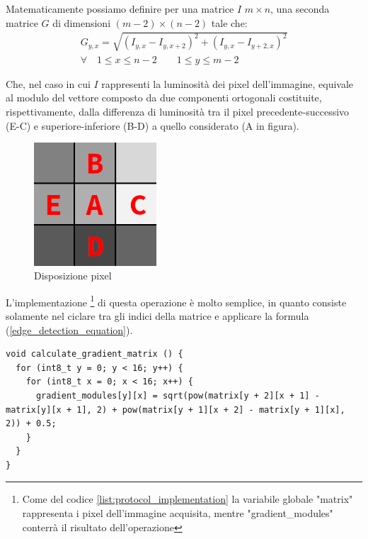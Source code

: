\documentclass[12pt]{article}
\newenvironment{changemargin}[2]{%
    \begin{list}{}{%
    \setlength{\topsep}{0pt}%
    \setlength{\leftmargin}{#1}%
    \setlength{\rightmargin}{#2}%
    \setlength{\listparindent}{\parindent}%
    \setlength{\itemindent}{\parindent}%
    \setlength{\parsep}{\parskip}%
    }%
    \item[]}{\end{list}}
\begin{document}
        Matematicamente possiamo definire per una matrice $I$ $m \times n$, una seconda matrice $G$ di dimensioni $(m-2) \times (n-2)$ tale che:
        \begin{equation}\label{edge_detection_equation}
        \begin{split}
            G_{y, x} = \sqrt{\left(I_{y, x} - I_{y, x+2}\right)^2 + \left( I_{y, x} - I_{y+2, x} \right)^2} \\
            \forall \quad 1 \leq x \leq n-2 \qquad
            1 \leq y \leq m-2
        \end{split}
        \end{equation} 
        
        Che, nel caso in cui $I$ rappresenti la luminosità dei pixel dell'immagine, equivale al modulo del vettore composto da due componenti ortogonali costituite, rispettivamente, dalla differenza di luminosità tra il pixel precedente-successivo (E-C) e superiore-inferiore (B-D) a quello considerato (A in figura).
        
        \begin{figure}[h]
        \centering
            \includegraphics[width=130pt]{Draws/Edge_detection_pixel_label.png}
            \caption{Disposizione pixel}
        \end{figure}
        
        L'implementazione \footnote{Come del codice \ref{list:protocol_implementation} la variabile globale "matrix" rappresenta i pixel dell'immagine acquisita, mentre "gradient\_modules" conterrà il risultato dell'operazione} di questa operazione è molto semplice, in quanto consiste solamente nel ciclare tra gli indici della matrice e applicare la formula (\ref{edge_detection_equation}).
        \begin{changemargin}{-2cm}{-2cm}
        \begin{lstlisting}[label={list:edge_detection_code}, style=Arduino, caption=Calcolo matrice edge-detection, basicstyle=\scriptsize]
void calculate_gradient_matrix () {
  for (int8_t y = 0; y < 16; y++) {
    for (int8_t x = 0; x < 16; x++) {
      gradient_modules[y][x] = sqrt(pow(matrix[y + 2][x + 1] - matrix[y][x + 1], 2) + pow(matrix[y + 1][x + 2] - matrix[y + 1][x], 2)) + 0.5;
    }
  }
}       \end{lstlisting}
        \end{changemargin}
        
\end{document}
